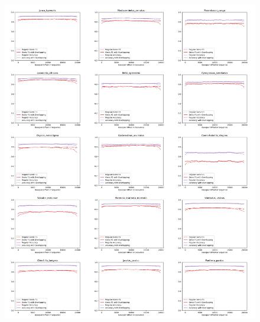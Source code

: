 \documentclass{article}
\begin{document}
\begin{figure}[!h]
\centerline{\includegraphics[width=\overlapscale\textwidth]{images/overlapping/montage_animals5}}
\end{figure}
\end{document}
